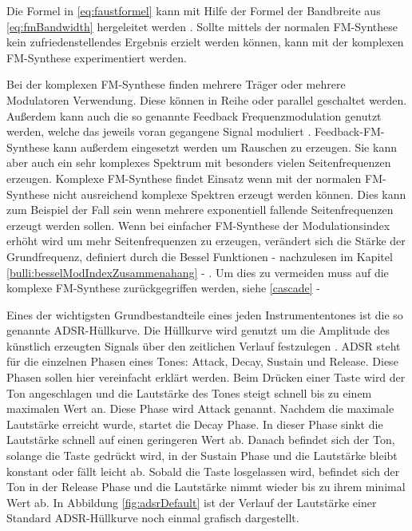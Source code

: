 Die Formel in \ref{eq:faustformel} kann mit Hilfe der Formel der Bandbreite aus \ref{eq:fmBandwidth} hergeleitet werden \cite[S. 221]{lathi}. Sollte mittels der normalen FM-Synthese kein zufriedenstellendes Ergebnis erzielt werden können, kann mit der komplexen FM-Synthese experimentiert werden. 

Bei der komplexen FM-Synthese finden mehrere Träger oder mehrere Modulatoren Verwendung. Diese können in Reihe oder parallel geschaltet werden. Außerdem kann auch die so genannte Feedback Frequenzmodulation genutzt werden, welche das jeweils voran gegangene Signal moduliert \cite[S. 399 f.]{hornerPaper}. Feedback-FM-Synthese kann außerdem eingesetzt werden um Rauschen zu erzeugen. Sie kann aber auch ein sehr komplexes Spektrum mit besonders vielen Seitenfrequenzen erzeugen. Komplexe FM-Synthese findet Einsatz wenn mit der normalen FM-Synthese nicht ausreichend komplexe Spektren erzeugt werden können. Dies kann zum Beispiel der Fall sein wenn mehrere exponentiell fallende Seitenfrequenzen erzeugt werden sollen. Wenn bei einfacher FM-Synthese der Modulationsindex erhöht wird um mehr Seitenfrequenzen zu erzeugen, verändert sich die Stärke der Grundfrequenz, definiert durch die Bessel Funktionen - nachzulesen im Kapitel \ref{bulli:besselModIndexZusammenahang} - . Um dies zu vermeiden muss auf die komplexe FM-Synthese zurückgegriffen werden, siehe \ref{cascade} - 

Eines der wichtigsten Grundbestandteile eines jeden Instrumententones ist die so genannte ADSR-Hüllkurve. Die Hüllkurve wird genutzt um die Amplitude des künstlich erzeugten Signals über den zeitlichen Verlauf festzulegen \cite[S. 532f]{chowningPaper}. ADSR steht für die einzelnen Phasen eines Tones: Attack, Decay, Sustain und Release. Diese Phasen sollen hier vereinfacht erklärt werden. Beim Drücken einer Taste wird der Ton angeschlagen und die Lautstärke des Tones steigt schnell bis zu einem maximalen Wert an. Diese Phase wird Attack genannt. Nachdem die maximale Lautstärke erreicht wurde, startet die Decay Phase. In dieser Phase sinkt die Lautstärke schnell auf einen geringeren Wert ab. Danach befindet sich der Ton, solange die Taste gedrückt wird, in der Sustain Phase und die Lautstärke bleibt konstant oder fällt leicht ab. Sobald die Taste losgelassen wird, befindet sich der Ton in der Release Phase und die Lautstärke nimmt wieder bis zu ihrem minimal Wert ab. In Abbildung \ref{fig:adsrDefault} ist der Verlauf der Lautstärke einer Standard ADSR-Hüllkurve noch einmal grafisch dargestellt.

